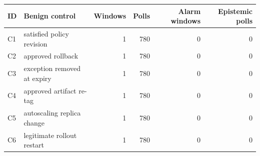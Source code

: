\begin{tabular}{@{}llrrrr@{}}
\toprule
ID & Benign control & Windows & Polls & Alarm windows & Epistemic polls \\
\midrule
C1 & satisfied policy revision & 1 & 780 & 0 & 0 \\
C2 & approved rollback & 1 & 780 & 0 & 0 \\
C3 & exception removed at expiry & 1 & 780 & 0 & 0 \\
C4 & approved artifact re-tag & 1 & 780 & 0 & 0 \\
C5 & autoscaling replica change & 1 & 780 & 0 & 0 \\
C6 & legitimate rollout restart & 1 & 780 & 0 & 0 \\
\bottomrule
\end{tabular}
